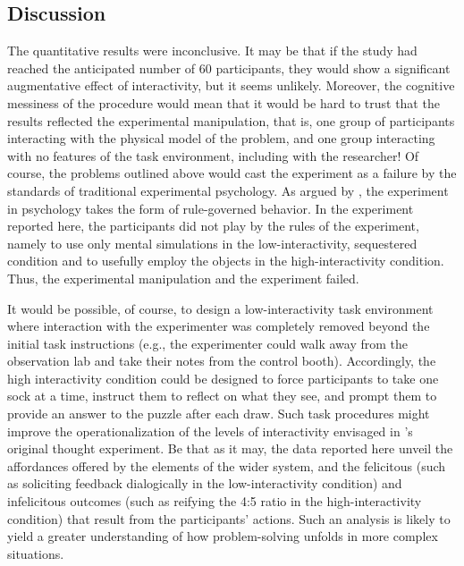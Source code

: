\documentclass[twocolumn, serif, empirical, authordate]{jote-article}
\begin{document}
{{
\subsection{Discussion}

The quantitative results were inconclusive. It may be that if the study had reached the anticipated number of 60 participants, they would show a significant augmentative effect of interactivity, but it seems unlikely.
Moreover, the cognitive messiness of the procedure would mean that it would be hard to trust that the results reflected the experimental manipulation, that is, one group of participants interacting with the physical model of the problem, and one group interacting with no features of the task environment, including with the researcher! Of course, the problems outlined above would cast the experiment as a failure by the standards of traditional experimental psychology. As argued by \textcite{Gozli2017}, the experiment in psychology takes the form of rule-governed behavior. In the experiment reported here, the participants did not play by the rules of the experiment, namely to use only mental simulations in the low-interactivity, sequestered condition and to usefully employ the objects in the high-interactivity condition.
Thus, the experimental manipulation and the experiment failed.

It would be possible, of course, to design a low-interactivity task environment where interaction with the experimenter was completely removed beyond the initial task instructions (e.g., the experimenter could walk away from the observation lab and take their notes from the control booth). Accordingly, the high interactivity condition could be designed to force participants to take one sock at a time, instruct them to reflect on what they see, and prompt them to provide an answer to the puzzle after each draw. Such task procedures might improve the operationalization of the levels of interactivity envisaged in \textcite{Vallée-Tourangeau2020}'s original thought experiment. Be that as it may, the data reported here unveil the affordances offered by the elements of the wider system, and the felicitous (such as soliciting feedback dialogically in the low-interactivity condition) and infelicitous outcomes (such as reifying the 4:5 ratio in the high-interactivity condition) that result from the participants' actions. Such an analysis is likely to yield a greater understanding of how problem-solving unfolds in more complex situations.

}}
\end{document}
